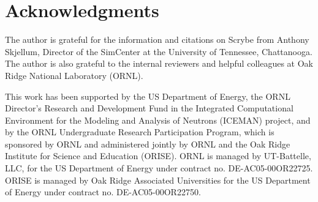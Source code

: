 \section*{Acknowledgments}\label{acknowledgments}

The author is grateful for the information and citations on Scrybe from Anthony Skjellum, Director of the SimCenter at the University of Tennessee, Chattanooga. The author is also grateful to the internal reviewers and helpful colleagues at Oak Ridge National Laboratory (ORNL).

This work has been supported by the US Department of Energy, the ORNL Director's Research and Development Fund in the Integrated Computational Environment for the Modeling and Analysis of Neutrons (ICEMAN) project, and by the ORNL Undergraduate Research Participation Program, which is sponsored by ORNL and administered jointly by ORNL and the Oak Ridge Institute for Science and
Education (ORISE). ORNL is managed by UT-Battelle, LLC, for the US Department of Energy under contract no. DE-AC05-00OR22725. ORISE is managed by Oak Ridge Associated Universities for the US Department of Energy under contract no. DE-AC05-00OR22750.
